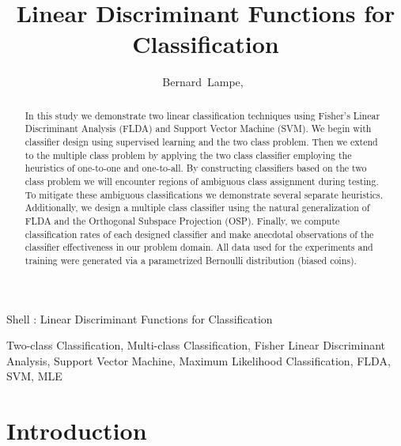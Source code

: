 \documentclass[journal]{IEEEtran}
\begin{document}
\title{Linear Discriminant Functions for Classification}

\author{Bernard~Lampe,~}

{Shell \MakeLowercase{\Lampe}: Linear Discriminant Functions for Classification}

\maketitle

\begin{abstract}
In this study we demonstrate two linear classification techniques using Fisher's Linear Discriminant Analysis (FLDA) and Support Vector Machine (SVM). We begin with classifier design using supervised learning and the two class problem. Then we extend to the multiple class problem by applying the two class classifier employing the heuristics of one-to-one and one-to-all. By constructing classifiers based on the two class problem we will encounter regions of ambiguous class assignment during testing. To mitigate these ambiguous classifications we demonstrate several separate heuristics. Additionally, we design a multiple class classifier using the natural generalization of FLDA and the Orthogonal Subspace Projection (OSP). Finally, we compute classification rates of each designed classifier and make anecdotal observations of the classifier effectiveness in our problem domain. All data used for the experiments and training were generated via a parametrized Bernoulli distribution (biased coins).
\end{abstract}

\begin{IEEEkeywords}
Two-class Classification, Multi-class Classification, Fisher Linear Discriminant Analysis, Support Vector Machine, Maximum Likelihood Classification, FLDA, SVM, MLE
\end{IEEEkeywords}

\section{Introduction}
\end{document}
